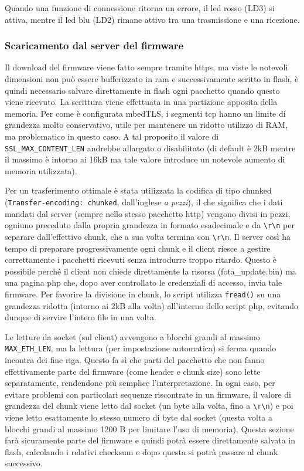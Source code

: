 Quando una funzione di connessione ritorna un errore, il led rosso (LD3) si attiva, mentre il led blu (LD2) rimane attivo tra una trasmissione e una ricezione.

\subsubsection{Scaricamento dal server del firmware}


Il download del firmware viene fatto sempre tramite https, ma viste le notevoli dimensioni non pu\`o essere bufferizzato in ram e successivamente scritto in flash, \`e quindi necessario salvare direttamente in flash ogni pacchetto quando questo viene ricevuto. La scrittura viene effettuata in una partizione apposita della memoria. Per come \`e configurata mbedTLS, i segmenti tcp hanno un limite di grandezza molto conservativo, utile per mantenere un ridotto utilizzo di RAM, ma problematico in questo caso. A tal proposito il valore di \texttt{SSL\_MAX\_CONTENT\_LEN} andrebbe allargato o disabilitato (di default \`e 2kB mentre il massimo \`e intorno ai 16kB ma tale valore introduce un notevole aumento di memoria utilizzata).

Per un trasferimento ottimale \`e stata utilizzata la codifica di tipo chunked (\texttt{Transfer-encoding: chunked}, dall'inglese \textit{a pezzi}), il che significa che i dati mandati dal server (sempre nello stesso pacchetto http) vengono divisi in pezzi, ogniuno preceduto dalla propria grandezza in formato esadecimale e da \texttt{\textbackslash{r}\textbackslash{n}} per separare dall'effettivo chunk, che a sua volta termina con \texttt{\textbackslash{r}\textbackslash{n}}. Il server cos\`i ha tempo di preparare progressivamente ogni chunk e il client riesce a gestire correttamente i pacchetti ricevuti senza introdurre troppo ritardo. Questo \`e possibile perch\'e il client non chiede direttamente la risorsa (fota\_update.bin) ma una pagina php che, dopo aver controllato le credenziali di accesso, invia tale firmware. Per favorire la divisione in chunk, lo script utilizza \texttt{fread()} su una grandezza ridotta (intorno ai 2kB alla volta) all'interno dello script php, evitando dunque di servire l'intero file in una volta.

Le letture da socket (sul client) avvengono a blocchi grandi al massimo \texttt{MAX\_ETH\_LEN}, ma la lettura (per impostazione automatica) si ferma quando incontra dei fine riga. Questo fa s\`i che parti del pacchetto che non fanno effettivamente parte del firmware (come header e chunk size) sono lette separatamente, rendendone pi\`u semplice l'interpretazione. In ogni caso, per evitare problemi con particolari sequenze riscontrate in un firmware, il valore di grandezza del chunk viene letto dal socket (un byte alla volta, fino a \texttt{\textbackslash{r}\textbackslash{n}}) e poi viene letto esattamente lo stesso numero di byte dal socket (questa volta a blocchi grandi al massimo 1200 B per limitare l'uso di memoria). Questa sezione far\`a sicuramente parte del firmware e quindi potr\`a essere direttamente salvata in flash, calcolando i relativi checksum e dopo questa si potr\`a passare al chunk successivo.

